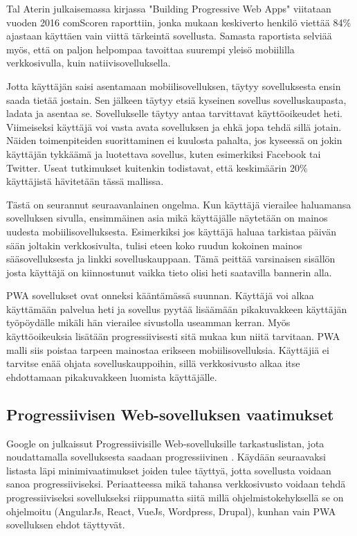 \documentclass{tktltiki}
\begin{document}
Tal Aterin julkaisemassa kirjassa "Building Progressive Web Apps" \cite{ater2017building} viitataan vuoden 2016 comScoren raporttiin, jonka mukaan keskiverto henkilö viettää 84\% ajastaan käyttäen vain viittä tärkeintä sovellusta. Samasta raportista selviää myös, että on paljon helpompaa tavoittaa suurempi yleisö mobiililla verkkosivulla, kuin natiivisovelluksella. 

Jotta käyttäjän saisi asentamaan mobiilisovelluksen, täytyy sovelluksesta ensin saada tietää jostain. Sen jälkeen täytyy etsiä kyseinen sovellus sovelluskaupasta, ladata ja asentaa se. Sovellukselle täytyy antaa tarvittavat käyttöoikeudet heti. Viimeiseksi käyttäjä voi vasta avata sovelluksen ja ehkä jopa tehdä sillä jotain. Näiden toimenpiteiden suorittaminen ei kuulosta pahalta, jos kyseessä on jokin käyttäjän tykkäämä ja luotettava sovellus, kuten esimerkiksi Facebook tai Twitter. Useat tutkimukset kuitenkin todistavat, että keskimäärin 20\% käyttäjistä hävitetään tässä mallissa. 

Tästä on seurannut seuraavanlainen ongelma. Kun käyttäjä vierailee haluamansa sovelluksen sivulla, ensimmäinen asia mikä käyttäjälle näytetään on mainos uudesta mobiilisovelluksesta. Esimerkiksi jos käyttäjä haluaa tarkistaa päivän sään joltakin verkkosivulta, tulisi eteen koko ruudun kokoinen mainos sääsovelluksesta ja linkki sovelluskauppaan. Tämä peittää varsinaisen sisällön josta käyttäjä on kiinnostunut vaikka tieto olisi heti saatavilla bannerin alla. 

PWA sovellukset ovat onneksi kääntämässä suunnan. Käyttäjä voi alkaa käyttämään palvelua heti ja sovellus pyytää lisäämään pikakuvakkeen käyttäjän työpöydälle mikäli hän vierailee sivustolla useamman kerran. Myös käyttöoikeuksia lisätään progressiivisesti sitä mukaa kun niitä tarvitaan. PWA malli siis poistaa tarpeen mainostaa erikseen mobiilisovelluksia. Käyttäjiä ei tarvitse enää ohjata sovelluskauppoihin, sillä verkkosivusto alkaa itse ehdottamaan pikakuvakkeen luomista käyttäjälle. 

\subsection{Progressiivisen Web-sovelluksen vaatimukset}

Google on julkaissut Progressiivisille Web-sovelluksille tarkastuslistan, jota noudattamalla sovelluksesta saadaan progressiivinen \cite{Google}. Käydään seuraavaksi listasta läpi minimivaatimukset joiden tulee täyttyä, jotta sovellusta voidaan sanoa progressiiviseksi. Periaatteessa mikä tahansa verkkosivusto voidaan tehdä progressiiviseksi sovellukseksi \cite{hiltunen2018creating} riippumatta siitä millä ohjelmistokehyksellä se on ohjelmoitu (AngularJs, React, VueJs, Wordpress, Drupal), kunhan vain PWA sovelluksen ehdot täyttyvät.
\end{document}
